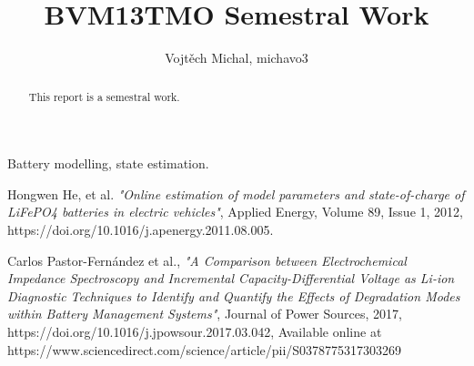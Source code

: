 \documentclass[journal,onecolumn]{IEEEtran}
\begin{document}

\title{BVM13TMO Semestral Work}
\author{Vojtěch Michal, michavo3}

%

\maketitle

\begin{abstract}
This report is a semestral work.
\end{abstract}

\begin{IEEEkeywords}
Battery modelling, state estimation.
\end{IEEEkeywords}
















\IEEEpeerreviewmaketitle






\ifCLASSOPTIONcaptionsoff
  \newpage
\fi

\begin{thebibliography}{9}

Hongwen He, et al.
\emph{"Online estimation of model parameters and state-of-charge of LiFePO4 batteries in electric vehicles"},
Applied Energy,
Volume 89, Issue 1,
2012,
https://doi.org/10.1016/j.apenergy.2011.08.005.
    
    Carlos Pastor-Fernández et al.,
    \emph{"A Comparison between Electrochemical Impedance Spectroscopy and Incremental Capacity-Differential Voltage as Li-ion Diagnostic Techniques to Identify and Quantify the Effects of Degradation Modes within Battery Management Systems"},
    Journal of Power Sources,
    2017,
    https://doi.org/10.1016/j.jpowsour.2017.03.042,
    Available online at https://www.sciencedirect.com/science/article/pii/S0378775317303269

\end{thebibliography}


\end{document}
